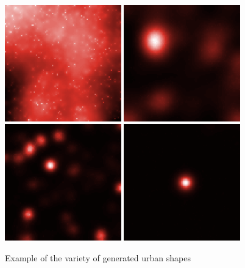 \begin{figure}
\includegraphics[width=0.45\textwidth]{Figures/PartII/Modeling/UrbanGrowth/ex4}\hspace{0.5cm}
\includegraphics[width=0.45\textwidth]{Figures/PartII/Modeling/UrbanGrowth/ex5}\\\medskip
\includegraphics[width=0.45\textwidth]{Figures/PartII/Modeling/UrbanGrowth/ex6}\hspace{0.5cm}
\includegraphics[width=0.45\textwidth]{Figures/PartII/Modeling/UrbanGrowth/ex7}\\
\caption[Generated Density urban shapes]{Example of the variety of generated urban shapes}
\label{fig:densitygeneration}
\end{figure}




